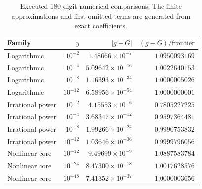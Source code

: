 \begin{table}[htbp]
\centering\small
\begin{tabular}{@{}lrrr@{}}
\toprule
Family & $y$ & $|g-G|$ & $(g-G)/\text{frontier}$ \\
\midrule
Logarithmic & $10^{-2}$ & $1.48666\times10^{-7}$ & $1.0950093169$ \\
Logarithmic & $10^{-4}$ & $5.09642\times10^{-16}$ & $1.0022640153$ \\
Logarithmic & $10^{-8}$ & $1.16393\times10^{-34}$ & $1.0000005026$ \\
Logarithmic & $10^{-12}$ & $6.58956\times10^{-54}$ & $1.0000000001$ \\
Irrational power & $10^{-2}$ & $4.15553\times10^{-6}$ & $0.7805227225$ \\
Irrational power & $10^{-4}$ & $3.68347\times10^{-12}$ & $0.9597364481$ \\
Irrational power & $10^{-8}$ & $1.99266\times10^{-24}$ & $0.9990753832$ \\
Irrational power & $10^{-12}$ & $1.03646\times10^{-36}$ & $0.9999796056$ \\
Nonlinear core & $10^{-12}$ & $9.49699\times10^{-9}$ & $1.0887583784$ \\
Nonlinear core & $10^{-24}$ & $8.47300\times10^{-18}$ & $1.0017628576$ \\
Nonlinear core & $10^{-48}$ & $7.41352\times10^{-37}$ & $1.0000003656$ \\
\bottomrule
\end{tabular}
\caption{Executed 180-digit numerical comparisons. The finite approximations and first omitted terms are generated from exact coefficients.}
\label{tab:numerics}
\end{table}
